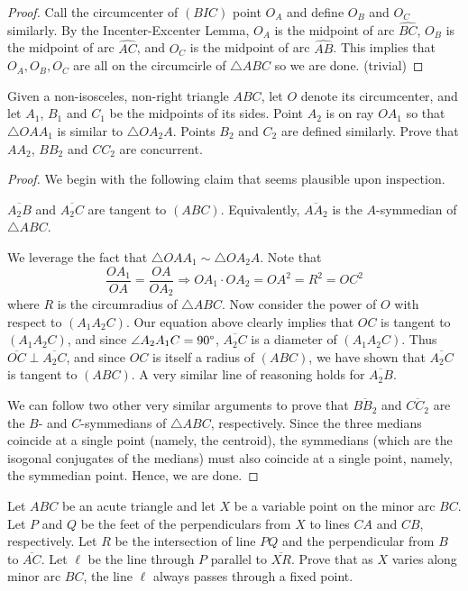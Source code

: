 \documentclass[letterpaper,oneside]{scrartcl}
\providecommand{\ol}{\overline}
\begin{document}
\begin{proof}
  Call the circumcenter of $(BIC)$ point $O_A$ and define $O_B$ and $O_C$ similarly. By the Incenter-Excenter Lemma, $O_A$ is the midpoint of arc \(\widehat{BC}\), $O_B$ is the midpoint of arc \(\widehat{AC}\), and $O_C$ is the midpoint of arc \(\widehat{AB}\). This implies that \(O_A, O_B, O_C\) are all on the circumcirle of \(\triangle ABC\) so we are done. (trivial)
\end{proof}
\begin{problem*}
  [4.43, USAMO 1995/3]
  Given a non-isosceles, non-right triangle $ABC$, let $O$ denote its circumcenter, and let $A_1$, $B_1$ and $C_1$ be the midpoints of its sides. Point $A_2$ is on ray $OA_1$ so that $\triangle OAA_1$ is similar to $\triangle OA_2A$. Points $B_2$ and $C_2$ are defined similarly. Prove that $AA_2$, $BB_2$ and $CC_2$ are concurrent.
\end{problem*}
\begin{proof}
  We begin with the following claim that seems plausible upon inspection.
  \begin{claim*}
    \(\ol{A_2B}\) and \(\ol{A_2C}\) are tangent to \((ABC)\). Equivalently, \(\ol{AA_2}\) is the $A$-symmedian of \(\triangle ABC\).
  \end{claim*}
  \begin{subproof}
    We leverage the fact that \(\triangle OAA_1 \sim \triangle OA_2A\). Note that 
    \[\frac{OA_1}{OA} = \frac{OA}{OA_2} \Rightarrow OA_1 \cdot OA_2 = {OA}^2 = R^2 = {OC}^2\]
    where $R$ is the circumradius of \(\triangle ABC\).
    Now consider the power of \(O\) with respect to \((A_1A_2C)\). Our equation above clearly implies that \(OC\) is tangent to \((A_1A_2C)\), and since \(\angle A_2A_1C = 90\degree\), \(\ol{A_2C}\) is a diameter of \((A_1A_2C)\). Thus \(\ol{OC} \perp \ol{A_2C}\), and since \(OC\) is itself a radius of \((ABC)\), we have shown that \(\ol{A_2C}\) is tangent to \((ABC)\). A very similar line of reasoning holds for \(\ol{A_2B}\).
  \end{subproof}
  We can follow two other very similar arguments to prove that \(\ol{BB_2}\) and \(\ol{CC_2}\) are the $B$- and $C$-symmedians of \(\triangle ABC\), respectively. Since the three medians coincide at a single point (namely, the centroid), the symmedians (which are the isogonal conjugates of the medians) must also coincide at a single point, namely, the symmedian point. Hence, we are done.
\end{proof}
\newpage
\begin{problem*}
  Let $ABC$ be an acute triangle and let $X$ be a variable point on the minor arc $BC$. Let $P$ and $Q$ be the feet of the perpendiculars from $X$ to lines $CA$ and $CB$, respectively. Let $R$ be the intersection of line $PQ$ and the perpendicular from $B$ to $\overline{AC}$. Let $\ell$ be the line through $P$ parallel to $\overline{XR}$. Prove that as $X$ varies along minor arc $BC$, the line $\ell$ always passes through a fixed point.
\end{problem*}
\end{document}
